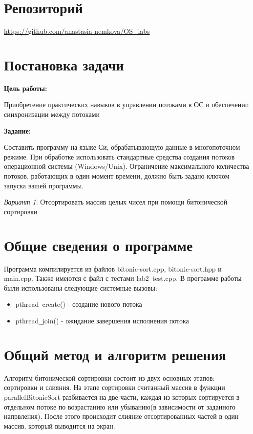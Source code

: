 \documentclass[a4paper, 14pt]{article}
\begin{document}
\section*{Репозиторий}   
\vspace{2ex}
\url{https://github.com/anastasia-nemkova/OS_labs}

\section*{Постановка задачи}   
\textbf{Цель работы:}
\vspace{2ex}

Приобретение практических навыков в управлении потоками в ОС и обеспечении синхронизации между потоками

\vspace{4ex}
\textbf{Задание:}
\vspace{2ex}

Составить программу на языке Си, обрабатывающую данные в многопоточном режиме. При обработке использовать стандартные средства создания потоков операционной системы (Windows/Unix). Ограничение максимального количества потоков, работающих в один момент времени, должно быть задано ключом запуска вашей программы.\newline

\textit{Вариант 1}: Отсортировать массив целых чисел при помощи битонической сортировки

\section*{Общие сведения о программе}
Программа компилируется из файлов bitonic-sort.cpp, bitonic-sort.hpp и main.cpp. Также имеются с файл с тестами lab2\texttt{\_}test.cpp. В программе работы были
использованы следующие системные вызовы:

\begin{itemize}
    \item pthread\texttt{\_}create() - создание нового потока
    \item pthread\texttt{\_}join() - ожидание завершения исполнения потока
\end{itemize}

\section*{Общий метод и алгоритм решения}

Алгоритм битонической сортировки состоит из двух основных этапов: сортировки и слияния. На этапе сортировки считанный массив в функции parallelBitonicSort разбивается на две части, каждая из которых сортируется в отдельном потоке по возрастанию или убыванию(в зависимости от заданного напрвления). После этого происходит слияние отсортированных частей в один массив, который выводится на экран.  
\newpage
\end{document}
